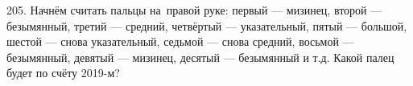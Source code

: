 205. Начнём считать пальцы на правой руке: первый --- мизинец, второй --- безымянный, третий --- средний, четвёртый --- указательный, пятый --- большой, шестой --- снова указательный, седьмой --- снова средний, восьмой --- безымянный, девятый --- мизинец, десятый --- безымянный и т.д. Какой палец будет по счёту 2019-м?\\
